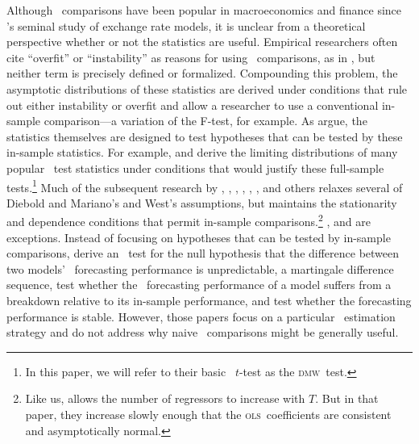 \documentclass[11pt]{article}
\newcommand{\citepos}[1]{\citeauthor{#1}'s \citeyearpar{#1}}
\newcommand{\dmw}{\textsc{dmw}}
\newcommand{\ols}{\textsc{ols}}
\begin{document}
Although \oos\ comparisons have been popular in macroeconomics and
finance since \citepos{meese_empirical_1983} seminal study of exchange
rate models, it is unclear from a theoretical perspective whether or
not the statistics are useful.  Empirical researchers often cite
``overfit'' or ``instability'' as reasons for using \oos\ comparisons,
as in \citet{stock_forecasting_2003}, but neither term is precisely
defined or formalized.  Compounding this problem, the asymptotic
distributions of these statistics are derived under conditions that
rule out either instability or overfit and allow a researcher to use a
conventional in-sample comparison---a variation of the F-test, for
example.  As \citet{inoue_kilian_2004} argue, the statistics
themselves are designed to test hypotheses that can be tested by these
in-sample statistics.  For example, \citet{diebold_comparing_1995} and
\citet{west_asymptotic_1996} derive the limiting distributions of many
popular \oos\ test statistics under conditions that would justify
these full-sample tests.\footnote{In this paper, we will refer to
  their basic \oos\ $t$-test as the \dmw\ test.}  Much of the
subsequent research by \citet{chao_out_2001},
\citet{clark_tests_2001,clark_evaluating_2005},
\citet{corradi_consistent_2002,corradi_recent_2004},
\citet{clark_using_2006,clark_approximately_2007},
\citet{mccracken_asymptotics_2007}, \citet{anatolyev_inference_2008},
and others relaxes several of Diebold and Mariano's and West's
assumptions, but maintains the stationarity and dependence conditions
that permit in-sample comparisons.\footnote{Like us,
  \citet{anatolyev_inference_2008} allows the number of regressors to
  increase with $T$.  But in that paper, they increase slowly enough
  that the \ols\ coefficients are consistent and asymptotically
  normal.}  \citet{giacomini_tests_2006}, and
\citet{giacomini-rossi-2009-REStud,giacomini-rossi-2010-JAppliedEconometrics}
are exceptions.  Instead of focusing on hypotheses that can be tested
by in-sample comparisons, \citet{giacomini_tests_2006} derive an \oos\
test for the null hypothesis that the difference between two models'
\oos\ forecasting performance is unpredictable, a martingale
difference sequence, \citet{giacomini-rossi-2009-REStud} test whether
the \oos\ forecasting performance of a model suffers from a breakdown
relative to its in-sample performance, and
\citet{giacomini-rossi-2010-JAppliedEconometrics} test whether the
forecasting performance is stable. However, those papers focus on a
particular \oos\ estimation strategy and do not address why naive
\oos\ comparisons might be generally useful.
\end{document}
